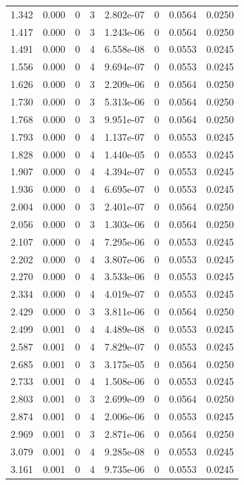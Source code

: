 \documentclass[preview]{standalone}
\begin{document}
{{\begin{tabular}{L{1.2cm}C{1.2cm} C{0.3cm}C{0.5cm} C{1.4cm}C{1.4cm} C{1.4cm}C{1.4cm}}
  1.342  &  0.000  & 0     &  3 &  2.802e-07  & 0  & 0.0564 &  0.0250   \\ 
  1.417  &  0.000  & 0     &  3 &  1.243e-06  & 0  & 0.0564 &  0.0250   \\ 
  1.491  &  0.000  & 0     &  4 &  6.558e-08  & 0  & 0.0553 &  0.0245   \\ 
  1.556  &  0.000  & 0     &  4 &  9.694e-07  & 0  & 0.0553 &  0.0245   \\ 
  1.626  &  0.000  & 0     &  3 &  2.209e-06  & 0  & 0.0564 &  0.0250   \\ 
  1.730  &  0.000  & 0     &  3 &  5.313e-06  & 0  & 0.0564 &  0.0250   \\ 
  1.768  &  0.000  & 0     &  3 &  9.951e-07  & 0  & 0.0564 &  0.0250   \\ 
  1.793  &  0.000  & 0     &  4 &  1.137e-07  & 0  & 0.0553 &  0.0245   \\ 
  1.828  &  0.000  & 0     &  4 &  1.440e-05  & 0  & 0.0553 &  0.0245   \\ 
  1.907  &  0.000  & 0     &  4 &  4.394e-07  & 0  & 0.0553 &  0.0245   \\ 
  1.936  &  0.000  & 0     &  4 &  6.695e-07  & 0  & 0.0553 &  0.0245   \\ 
  2.004  &  0.000  & 0     &  3 &  2.401e-07  & 0  & 0.0564 &  0.0250   \\ 
  2.056  &  0.000  & 0     &  3 &  1.303e-06  & 0  & 0.0564 &  0.0250   \\ 
  2.107  &  0.000  & 0     &  4 &  7.295e-06  & 0  & 0.0553 &  0.0245   \\ 
  2.202  &  0.000  & 0     &  4 &  3.807e-06  & 0  & 0.0553 &  0.0245   \\ 
  2.270  &  0.000  & 0     &  4 &  3.533e-06  & 0  & 0.0553 &  0.0245   \\ 
  2.334  &  0.000  & 0     &  4 &  4.019e-07  & 0  & 0.0553 &  0.0245   \\ 
  2.429  &  0.000  & 0     &  3 &  3.811e-06  & 0  & 0.0564 &  0.0250   \\ 
  2.499  &  0.001  & 0     &  4 &  4.489e-08  & 0  & 0.0553 &  0.0245   \\ 
  2.587  &  0.001  & 0     &  4 &  7.829e-07  & 0  & 0.0553 &  0.0245   \\ 
  2.685  &  0.001  & 0     &  3 &  3.175e-05  & 0  & 0.0564 &  0.0250   \\ 
  2.733  &  0.001  & 0     &  4 &  1.508e-06  & 0  & 0.0553 &  0.0245   \\ 
  2.803  &  0.001  & 0     &  3 &  2.699e-09  & 0  & 0.0564 &  0.0250   \\ 
  2.874  &  0.001  & 0     &  4 &  2.006e-06  & 0  & 0.0553 &  0.0245   \\ 
  2.969  &  0.001  & 0     &  3 &  2.871e-06  & 0  & 0.0564 &  0.0250   \\ 
  3.079  &  0.001  & 0     &  4 &  9.285e-08  & 0  & 0.0553 &  0.0245   \\ 
  3.161  &  0.001  & 0     &  4 &  9.735e-06  & 0  & 0.0553 &  0.0245   \\ 
\hline 
\end{tabular} 

}}
\end{document}
